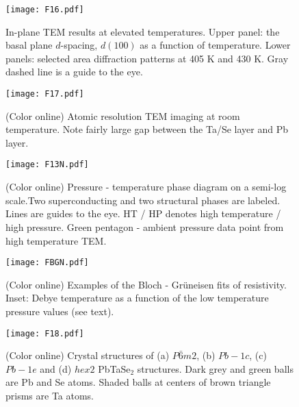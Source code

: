 \documentclass[aps,prb,preprint,groupedaddress,showpacs,amsmath,amssymb]{revtex4}
\begin{document}
\clearpage

\begin{figure}
\begin{center}
\texttt{[image: F16.pdf]}
\end{center}
\caption{In-plane TEM results at elevated temperatures. Upper panel: the basal plane $d$-spacing, $d (100)$ as a function of temperature. Lower panels: selected area diffraction patterns at 405 K and 430 K.  Gray dashed line is a guide to the eye.} \label{F16}
\end{figure}
\clearpage

\clearpage

\begin{figure}
\begin{center}
\texttt{[image: F17.pdf]}
\end{center}
\caption{(Color online) Atomic resolution TEM  imaging at room temperature. Note fairly large gap between the Ta/Se layer and Pb layer.} \label{F17}
\end{figure}
\clearpage

\begin{figure}
\begin{center}
\texttt{[image: F13N.pdf]}
\end{center}
\caption{(Color online) Pressure - temperature phase diagram on a semi-log scale.Two superconducting and two structural phases are labeled.  Lines are guides to the eye. HT / HP denotes high temperature / high pressure. Green pentagon - ambient pressure data point from high temperature TEM.} \label{F13}
\end{figure}

\clearpage

\begin{figure}
\begin{center}
\texttt{[image: FBGN.pdf]}
\end{center}
\caption{(Color online) Examples of the Bloch - Gr\"uneisen fits of resistivity. Inset: Debye temperature as a function of the low temperature  pressure values (see text).} \label{F14}
\end{figure}

\clearpage

\begin{figure}
\begin{center}
\texttt{[image: F18.pdf]}
\end{center}
\caption{(Color online) Crystal structures of (a) $P\bar{6}m2$, (b) $Pb{-}1c$, (c) $Pb{-}1e$ and (d) $hex2$  PbTaSe$_2$ structures. Dark grey and green balls are Pb and Se atoms. Shaded balls at centers of brown triangle prisms are Ta atoms.} \label{F18}
\end{figure}
\end{document}
